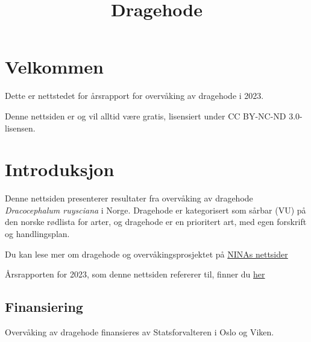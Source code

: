 \documentclass[
  letterpaper,
  DIV=11,
  numbers=noendperiod]{scrreport}
\title{Dragehode}
\author{}
\date{}
\renewcommand*\contentsname{Table of contents}
\newcommand\contentsname{Table of contents}
\begin{document}
\maketitle
\ifdefined\Shaded\renewenvironment{Shaded}{\begin{tcolorbox}[borderline west={3pt}{0pt}{shadecolor}, frame hidden, sharp corners, enhanced, breakable, boxrule=0pt, interior hidden]}{\end{tcolorbox}}\fi

\renewcommand*\contentsname{Table of contents}
{
\hypersetup{linkcolor=}
\setcounter{tocdepth}{2}
\tableofcontents
}

\hypertarget{velkommen}{%
\chapter*{Velkommen}\label{velkommen}}


Dette er nettstedet for årsrapport for overvåking av dragehode i 2023.

Denne nettsiden er og vil alltid være gratis, lisensiert under CC
BY-NC-ND 3.0-lisensen.


\hypertarget{sec-intro}{%
\chapter{Introduksjon}\label{sec-intro}}

Denne nettsiden presenterer resultater fra overvåking av dragehode
\emph{Dracocephalum ruysciana} i Norge. Dragehode er kategorisert som
sårbar (VU) på den norske rødlista for arter, og dragehode er en
prioritert art, med egen forskrift og handlingsplan.

Du kan lese mer om dragehode og overvåkingsprosjektet på
\href{https://www.nina.no/Naturmangfold/Trua-natur/Dragehode}{NINAs
nettsider}

Årsrapporten for 2023, som denne nettsiden refererer til, finner du
\href{https://brage.nina.no/nina-xmlui/handle/11250/3052108}{her}

\hypertarget{finansiering}{%
\section{Finansiering}\label{finansiering}}

Overvåking av dragehode finansieres av Statsforvalteren i Oslo og Viken.
\end{document}
